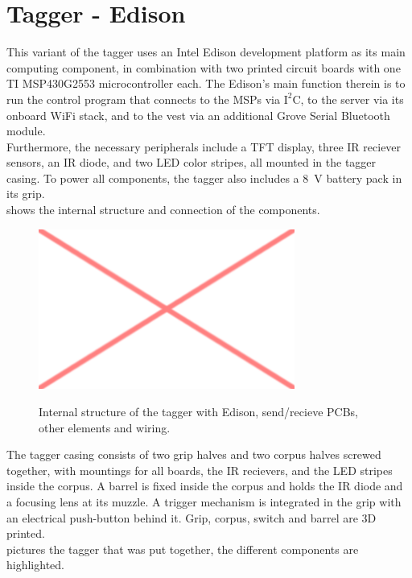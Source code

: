 \chapter{Tagger - Edison}
This variant of the tagger uses an Intel Edison development platform as its main computing component, in combination with two printed circuit boards with one TI MSP430G2553 microcontroller each. The Edison's main function therein is to run the control program that connects to the MSPs via $\text{I}^2\text{C}$, to the server via its onboard WiFi stack, and to the vest via an additional Grove Serial Bluetooth module.\\
Furthermore, the necessary peripherals include a  TFT display, three IR reciever sensors, an IR diode, and two LED color stripes, all mounted in the tagger casing. To power all components, the tagger also includes a \SI{8}{\volt} battery pack in its grip.\\
 shows the internal structure and connection of the components.

\begin{figure}[h!]
\centering
\includegraphics[width=0.75\textwidth]{images/placeholder.png}\\
\caption[Edison Tagger Structure]{Internal structure of the tagger with Edison, send/recieve PCBs, other elements and wiring.}
\label{fig:tag_ed_structure}
\end{figure}

The tagger casing consists of two grip halves and two corpus halves screwed together, with mountings for all boards, the IR recievers, and the LED stripes inside the corpus. A barrel is fixed inside the corpus and holds the IR diode and a focusing lens at its muzzle. A trigger mechanism is integrated in the grip with an electrical push-button behind it. Grip, corpus, switch and barrel are 3D printed.\\
 pictures the tagger that was put together, the different components are highlighted.

